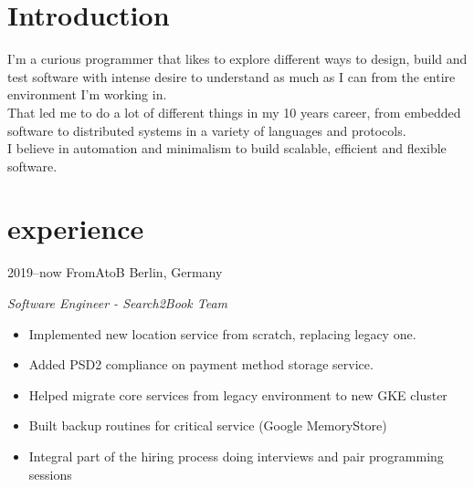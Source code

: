 \documentclass[]{friggeri-cv} %
\begin{document}
\section{Introduction}

\begin{entrylist}
\entry
{}
{}
{}
{
I'm a curious programmer that likes to explore different ways to design, build and test software
with intense desire to understand as much as I can from the entire environment I'm working in.\\

That led me to do a lot of different things in my 10 years career, from embedded
software to distributed systems in a variety of languages and protocols.\\

I believe in automation and minimalism to build scalable, efficient and flexible software.
}
\end{entrylist}


\section{experience}

\begin{entrylist}
\entry
{2019--now}
{FromAtoB}
{Berlin, Germany}
{\emph{Software Engineer - Search2Book Team} \\

\begin{itemize}
  \item Implemented new location service from scratch, replacing legacy one.
  \item Added PSD2 compliance on payment method storage service.
  \item Helped migrate core services from legacy environment to new GKE cluster
  \item Built backup routines for critical service (Google MemoryStore)
  \item Integral part of the hiring process doing interviews and pair programming sessions
\end{itemize}

}
\end{entrylist}
\end{document}
